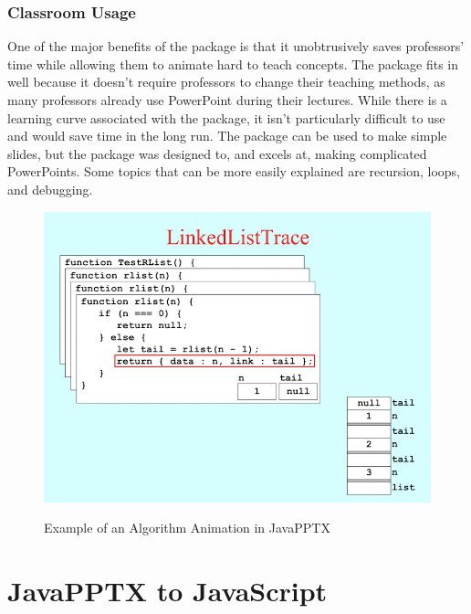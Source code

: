\documentclass[12pt,twoside]{reedthesis}
\begin{document}
\subsection{Classroom Usage}
One of the major benefits of the package is that it unobtrusively saves professors' time while allowing them to animate hard to teach concepts.  The package fits in well because it doesn't require professors to change their teaching methods, as many professors already use PowerPoint during their lectures. While there is a learning curve associated with the package, it isn't particularly difficult to use and would save time in the long run. The package can be used to make simple slides, but the package was designed to, and excels at, making complicated PowerPoints. Some topics that can be more easily explained are recursion, loops, and debugging. 
\begin{figure}[htbp] 
\begin{centering} 
\caption{Example of an Algorithm Animation in JavaPPTX} 
\includegraphics{algoanim} 
\label{subd}
\end{centering} 
\end{figure}
	

\chapter{JavaPPTX to JavaScript}
\end{document}
